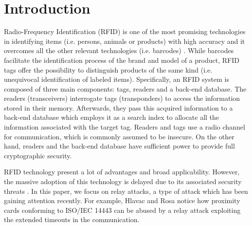 \documentclass{article}
\begin{document}
\section{Introduction}
Radio-Frequency Identification (RFID) is one of the most promising technologies in identifying items (i.e. persons, animals or products) with high accuracy and it overcomes all the other relevant technologies (i.e. barcodes) \cite{Jues-survey-2005}. While barcodes facilitate the identification process of the brand and model of a product, RFID tags offer the possibility to distinguish products of the same kind (i.e. unequivocal identification of labeled items).  Specifically, an RFID system is composed of three main components: tags, readers and a back-end database. The readers
(transceivers) interrogate tags (transponders) to access the
information stored in their memory. Afterwards, they pass this
acquired information to a back-end database which employs it as a search
index to allocate all the information associated with the
target tag. Readers and tags use a radio channel for
communication, which is commonly assumed to be insecure. On
the other hand, readers and the back-end database have sufficient power to provide full cryptographic security.

RFID technology  present a lot of advantages and broad applicability. However, the massive adoption of this technology is
delayed due to its associated security threats \cite{Jues-survey-2005,MitrokotsaRT-2008-iwrt}. In this paper, we focus on relay attacks, a type of attack which has been gaining attention recently. For example,  Hlavac and Rosa \cite{cryptoeprint:2007:244} notice how proximity cards conforming to ISO/IEC 14443 can be abused by a relay attack exploiting the extended timeouts in the communication.
\end{document}
